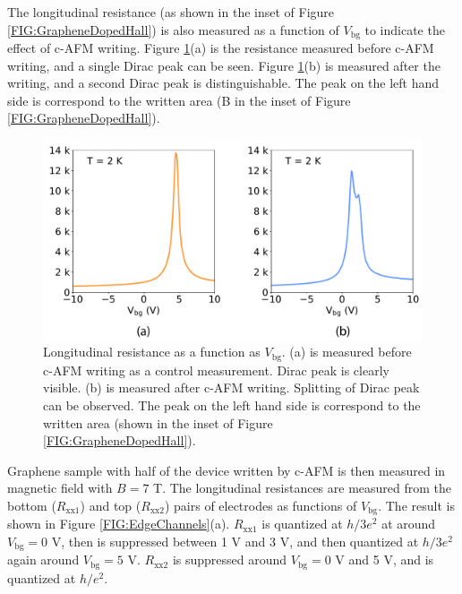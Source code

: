 \documentclass[pdflatex, sectionletters, 12pt]{pittetd}    %
\begin{document}
The longitudinal resistance (as shown in the inset of Figure \ref{FIG:GrapheneDopedHall}) is also measured as a function of $V_\mathrm{bg}$ to indicate the effect of c-AFM writing. Figure \ref{FIG:DiracPointSplit}(a) is the resistance measured before c-AFM writing, and a single Dirac peak can be seen. Figure \ref{FIG:DiracPointSplit}(b) is measured after the writing, and a second Dirac peak is distinguishable. The peak on the left hand side is correspond to the written area (B in the inset of Figure \ref{FIG:GrapheneDopedHall}).
\\

\begin{figure}[h!]
	\centering
	\includegraphics[width=.75\textwidth]{Drawing/DiracPointSplit.pdf}
	\caption{Longitudinal resistance as a function as $V_\mathrm{bg}$. (a) is measured before c-AFM writing as a control measurement. Dirac peak is clearly visible. (b) is measured after c-AFM writing. Splitting of Dirac peak can be observed. The peak on the left hand side is correspond to the written area (shown in the inset of Figure \ref{FIG:GrapheneDopedHall}).}
	\label{FIG:DiracPointSplit}
\end{figure}

Graphene sample with half of the device written by c-AFM is then measured in magnetic field with $B = 7$ T. The longitudinal resistances are measured from the bottom ($R_\mathrm{xx1}$) and top ($R_\mathrm{xx2}$) pairs of electrodes as functions of $V_\mathrm{bg}$. The result is shown in Figure \ref{FIG:EdgeChannels}(a). $R_\mathrm{xx1}$ is quantized at $h/3e^2$ at around $V_\mathrm{bg} = 0$ V, then is suppressed between 1 V and 3 V, and then quantized at $h/3e^2$ again around $V_\mathrm{bg} = 5$ V. $R_\mathrm{xx2}$ is suppressed around $V_\mathrm{bg} = 0$ V and 5 V, and is quantized at $h/e^2$. 
\end{document}
